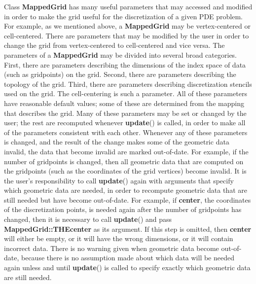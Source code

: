 \documentclass{article}
\begin{document}
Class \textbf{MappedGrid} has many useful parameters that may accessed and modified in order to make the grid useful for
the discretization of a given PDE problem.  For example, as we mentioned above, a \textbf{MappedGrid} may be vertex-centered
or cell-centered.  There are parameters that may be modified by the user in order to change the grid from vertex-centered to
cell-centered and vice versa.  The parameters of a \textbf{MappedGrid} may be divided into several broad categories.
First, there are parameters describing the dimensions of the index space of data (such as gridpoints) on the grid.  Second,
there are parameters describing the topology of the grid.  Third, there are parameters describing discretization stencils
used on the grid.  The cell-centering is such a parameter.  All of these parameters have reasonable default values;
some of these are determined from the mapping that describes the grid.  Many of these parameters may be set or changed by the
user; the rest are recomputed whenever \textbf{update}() is called, in order to make all of the parameters consistent with
each other.  Whenever any of these parameters is changed, and the result of the change makes some of the geometric data invalid,
the data that become invalid are marked out-of-date.  For example, if the number of gridpoints is changed, then all geometric
data that are computed on the gridpoints (such as the coordinates of the grid vertices) become invalid.  It is the user's
responsibility to call \textbf{update}() again with arguments that specify which geometric data are needed, in order to
recompute geometric data that are still needed but have become out-of-date.  For example, if \textbf{center}, the coordinates
of the discretization points, is needed again after the number of gridpoints has changed, then it is necessary to call
\textbf{update}() and pass \textbf{MappedGrid::THEcenter} as its argument.  If this step is omitted, then \textbf{center}
will either be empty, or it will have the wrong dimensions, or it will contain incorrect data.  There is no warning given when
geometric data become out-of-date, because there is no assumption made about which data will be needed again unless and until
\textbf{update}() is called to specify exactly which geometric data are still needed.
\end{document}
